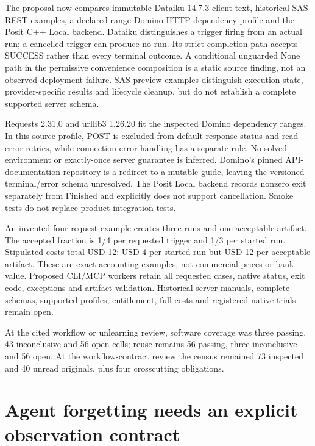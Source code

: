 The proposal now compares immutable Dataiku 14.7.3 client text,
historical SAS REST examples, a declared-range Domino HTTP dependency
profile and the Posit C++ Local backend. Dataiku distinguishes a trigger
firing from an actual run; a cancelled trigger can produce no run. Its
strict completion path accepts SUCCESS rather than every terminal
outcome. A conditional unguarded None path in the permissive convenience
composition is a static source finding, not an observed deployment
failure. SAS preview examples distinguish execution state,
provider-specific results and lifecycle cleanup, but do not establish a
complete supported server schema.
\citep{exec24_workflow_contracts_dataiku,exec24_workflow_contracts_sas}

Requests 2.31.0 and urllib3 1.26.20 fit the inspected Domino dependency
ranges. In this source profile, POST is excluded from default
response-status and read-error retries, while connection-error handling
has a separate rule. No solved environment or exactly-once server
guarantee is inferred. Domino's pinned API-documentation repository is a
redirect to a mutable guide, leaving the versioned terminal/error schema
unresolved. The Posit Local backend records nonzero exit separately from
Finished and explicitly does not support cancellation. Smoke tests do
not replace product integration tests.
\citep{exec24_workflow_contracts_domino,exec24_workflow_contracts_posit}

An invented four-request example creates three runs and one acceptable
artifact. The accepted fraction is 1/4 per requested trigger and 1/3 per
started run. Stipulated costs total USD 12: USD 4 per started run but
USD 12 per acceptable artifact. These are exact accounting examples, not
commercial prices or bank value. Proposed CLI/MCP workers retain all
requested cases, native status, exit code, exceptions and artifact
validation. Historical server manuals, complete schemas, supported
profiles, entitlement, full costs and registered native trials remain
open. \citep{exec24_workflow_contracts_reference}

At the cited workflow or unlearning review, software coverage was three
passing, 43 inconclusive and 56 open cells; reuse remains 56 passing,
three inconclusive and 56 open. At the workflow-contract review the
census remained 73 inspected and 40 unread originals, plus four
crosscutting obligations.
\citep{sp24workflowcontracts_reader,sp24workflowcontracts_progress}

\hypertarget{agent-forgetting-needs-an-explicit-observation-contract}{%
\section{Agent forgetting needs an explicit observation
contract}\label{agent-forgetting-needs-an-explicit-observation-contract}}

